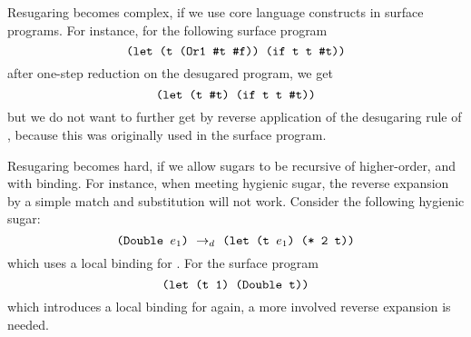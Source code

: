 
Resugaring becomes complex, if we use core language constructs in  surface programs. For instance, for the following surface program
\[
\texttt{(let (t (Or1 \#t \#f)) (if t t \#t))}
\]
after one-step reduction on the desugared program, we get
\[
\texttt{(let (t \#t) (if t t \#t))}
\]
but we do not want to further get  by reverse application of the desugaring rule of , because this  was originally used in the surface program.

Resugaring becomes hard, if we allow sugars to be recursive of higher-order, and with binding.
For instance, when meeting hygienic sugar, the reverse expansion by a simple match and substitution will not work. Consider the following hygienic sugar:
\[
\texttt{(Double $e_1$)} ~\rightarrow_d~ \texttt{(let (t $e_1$) (* 2 t))}
\]
which uses a local binding for . For the surface program
\[
\texttt{(let (t 1) (Double t))}
\]
which introduces a local binding for  again, a more involved reverse expansion is needed.

